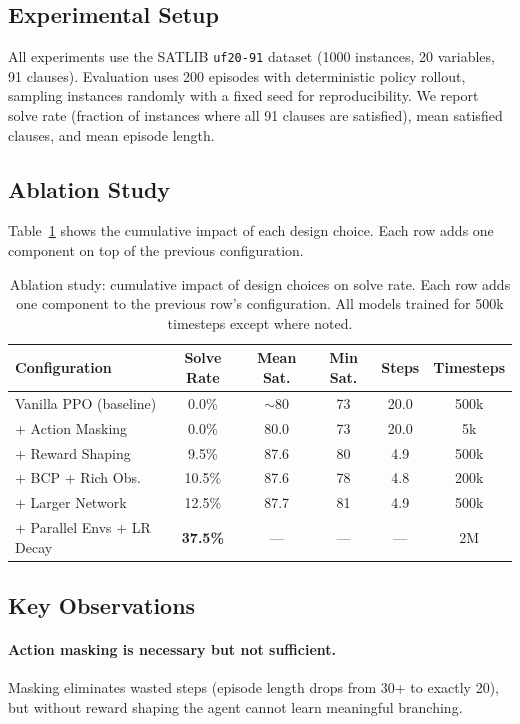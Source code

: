 \documentclass{article}
\begin{document}
\subsection{Experimental Setup}

All experiments use the SATLIB \texttt{uf20-91} dataset (1000 instances, 20 variables, 91 clauses). Evaluation uses 200 episodes with deterministic policy rollout, sampling instances randomly with a fixed seed for reproducibility. We report solve rate (fraction of instances where all 91 clauses are satisfied), mean satisfied clauses, and mean episode length.

\subsection{Ablation Study}

Table~\ref{tab:ablation} shows the cumulative impact of each design choice. Each row adds one component on top of the previous configuration.

\begin{table}[h]
\centering
\caption{Ablation study: cumulative impact of design choices on solve rate. Each row adds one component to the previous row's configuration. All models trained for 500k timesteps except where noted.}
\label{tab:ablation}
\begin{tabular}{@{}lccccc@{}}
\toprule
Configuration & Solve Rate & Mean Sat. & Min Sat. & Steps & Timesteps \\
\midrule
Vanilla PPO (baseline) & 0.0\% & $\sim$80 & 73 & 20.0 & 500k \\
\quad + Action Masking & 0.0\% & 80.0 & 73 & 20.0 & 5k \\
\quad + Reward Shaping & 9.5\% & 87.6 & 80 & 4.9 & 500k \\
\quad + BCP + Rich Obs. & 10.5\% & 87.6 & 78 & 4.8 & 200k \\
\quad + Larger Network & 12.5\% & 87.7 & 81 & 4.9 & 500k \\
\quad + Parallel Envs + LR Decay & \textbf{37.5\%} & --- & --- & --- & 2M \\
\bottomrule
\end{tabular}
\end{table}

\subsection{Key Observations}

\paragraph{Action masking is necessary but not sufficient.}
Masking eliminates wasted steps (episode length drops from 30+ to exactly 20), but without reward shaping the agent cannot learn meaningful branching.
\end{document}
